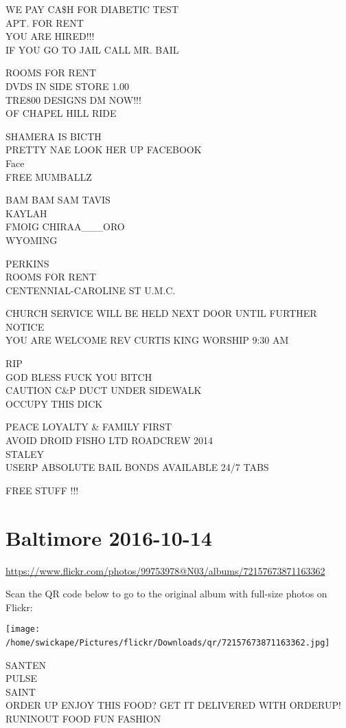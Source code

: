 \documentclass[10pt,letterpaper]{article}
\begin{document}
WE PAY CA\$H FOR DIABETIC TEST\\
APT. FOR RENT\\
YOU ARE HIRED!!!\\
IF YOU GO TO JAIL CALL MR. BAIL

ROOMS FOR RENT\\
DVDS IN SIDE STORE 1.00\\
TRE800 DESIGNS DM NOW!!!\\
OF CHAPEL HILL RIDE

SHAMERA IS BICTH\\
PRETTY NAE LOOK HER UP FACEBOOK\\
Face\\
FREE MUMBALLZ

BAM BAM SAM TAVIS\\
KAYLAH\\
FMOIG CHIRAA\_\_\_ORO\\
WYOMING

PERKINS\\
ROOMS FOR RENT\\
CENTENNIAL{-}CAROLINE ST U.M.C.

CHURCH SERVICE WILL BE HELD NEXT DOOR UNTIL FURTHER NOTICE\\
YOU ARE WELCOME REV CURTIS KING WORSHIP 9:30 AM

RIP\\
GOD BLESS FUCK YOU BITCH\\
CAUTION C\&P DUCT UNDER SIDEWALK\\
OCCUPY THIS DICK

PEACE LOYALTY \& FAMILY FIRST\\
AVOID DROID FISHO LTD ROADCREW 2014\\
STALEY\\
USERP ABSOLUTE BAIL BONDS AVAILABLE 24/7 TABS

FREE STUFF !!!
\

\section*{Baltimore 2016-10-14}

\url{https://www.flickr.com/photos/99753978@N03/albums/72157673871163362}

Scan the QR code below to go to the original album with full-size photos on Flickr:

\texttt{[image: /home/swickape/Pictures/flickr/Downloads/qr/72157673871163362.jpg]}
\

SANTEN\\
PULSE\\
SAINT\\
ORDER UP ENJOY THIS FOOD?  GET IT DELIVERED WITH ORDERUP!  RUNINOUT FOOD FUN FASHION
\end{document}
